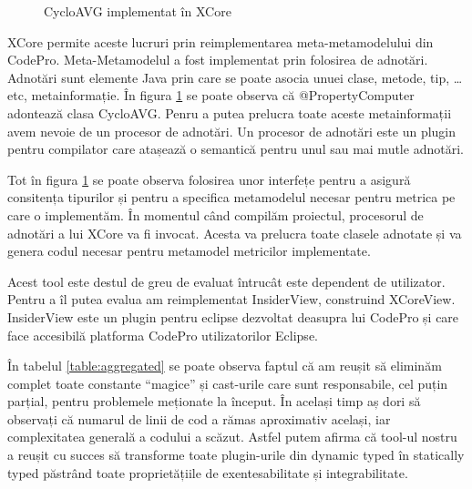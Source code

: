 \begin{figure}
\caption{CycloAVG implementat în XCore}
\label{fig:cycloAVGXCore}
\end{figure}

	XCore permite aceste lucruri prin reimplementarea meta-metamodelului din
CodePro. Meta-Metamodelul a fost implementat prin folosirea de adnotări.
Adnotări sunt elemente  Java prin care se poate asocia unuei clase,
metode, tip, \ldots{} etc, metainformație. În figura \ref{fig:cycloAVGXCore} se
poate observa că @PropertyComputer adontează clasa CycloAVG. Penru a putea
prelucra toate aceste metainformații avem nevoie de un procesor de adnotări. Un
procesor de adnotări este un plugin pentru compilator care atașează o semantică
pentru unul sau mai mutle adnotări. 

	Tot în figura \ref{fig:cycloAVGXCore} se poate observa folosirea unor
interfețe pentru a asigură consitența tipurilor și pentru a specifica
metamodelul necesar pentru metrica pe care o implementăm. În momentul când
compilăm proiectul, procesorul de adnotări a lui XCore va fi invocat. Acesta va
prelucra toate clasele adnotate și va genera codul necesar pentru metamodel
metricilor implementate.

	Acest tool este destul de greu de evaluat întrucât este dependent de
utilizator.  Pentru a îl putea evalua am reimplementat InsiderView, construind
XCoreView. InsiderView este un plugin pentru eclipse dezvoltat deasupra lui
CodePro și care face accesibilă platforma CodePro utilizatorilor Eclipse.
	
	În tabelul \ref{table:aggregated} se poate observa faptul că am reușit să
eliminăm complet toate constante \enquote{magice} și cast-urile care sunt
responsabile, cel puțin parțial, pentru problemele meționate la început. În
același timp aș dori să observați că numarul de linii de cod a rămas aproximativ
același, iar complexitatea generală a codului a scăzut. Astfel putem afirma că
tool-ul nostru a reușit cu succes să transforme toate plugin-urile din dynamic
typed în statically typed păstrând toate proprietățiile de exentesabilitate și
integrabilitate.
	
